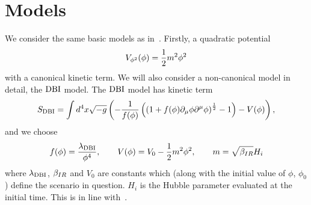\section{Models}\label{sec:interactions}
We consider the same basic models as in~\cite{Funakoshi}.
Firstly, a quadratic potential
\begin{align}\label{eq:quadratic_potential}
    V_{\phi^2}(\phi) = \frac{1}{2}m^2\phi^2
\end{align}
with a canonical kinetic term.
We will also consider a non-canonical model in detail, the $\text{DBI}$ model.
    The $\text{DBI}$ model has kinetic term
\begin{align}\label{eq:dbi_action}
    S_{\text{DBI}}=\int d^4x\sqrt{-g}\left(-\frac{1}{f(\phi)}\left(\left(1+f(\phi)\partial_\mu\phi\partial^\mu\phi\right)^{\frac{1}{2}}-1\right)-V(\phi)\right),
\end{align}
and we choose
\begin{align}\label{eq:dbi_warp}
    f(\phi)=\frac{\lambda_{\text{DBI}}}{\phi^4},\qquad
    V(\phi)=V_0-\frac{1}{2}m^2\phi^2,\qquad
    m=\sqrt{\beta_{IR}}H_{i}
\end{align}
where $\lambda_{\text{DBI}}$, $\beta_{IR}$ and $V_0$ are constants which
(along with the initial value of $\phi$, $\phi_0$) define the scenario in question.
$H_i$ is the Hubble parameter evaluated at the initial time.
This is in line with~\cite{Bean_ir_dbi, Chen_dbi}.


